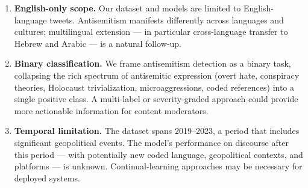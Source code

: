 \begin{enumerate}[leftmargin=*,itemsep=3pt]
    \item \textbf{English-only scope.} Our dataset and models are limited to English-language tweets. Antisemitism manifests differently across languages and cultures; multilingual extension --- in particular cross-language transfer to Hebrew and Arabic --- is a natural follow-up.

    \item \textbf{Binary classification.} We frame antisemitism detection as a binary task, collapsing the rich spectrum of antisemitic expression (overt hate, conspiracy theories, Holocaust trivialization, microaggressions, coded references) into a single positive class. A multi-label or severity-graded approach could provide more actionable information for content moderators.

    \item \textbf{Temporal limitation.} The dataset spans 2019--2023, a period that includes significant geopolitical events. The model's performance on discourse after this period --- with potentially new coded language, geopolitical contexts, and platforms --- is unknown. Continual-learning approaches may be necessary for deployed systems.
\end{enumerate}
